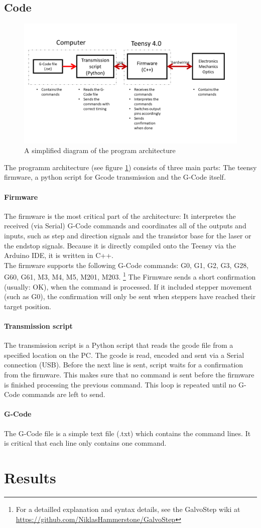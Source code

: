 \documentclass[a4paper, 11pt]{scrartcl}
\begin{document}
\subsection{Code}
\begin{figure}[H]
\begin{center}
\includegraphics[width=15cm]{img/programArchitecture.png}
\caption{A simplified diagram of the program architecture}
\label{code}
\end{center}
\end{figure}
The programm architecture (see figure \ref{code}) consists of three main parts: The teensy firmware, a python script for Gcode transmission and the G-Code itself. 
\paragraph{Firmware}
The firmware is the most critical part of the architecture: It interpretes the received (via Serial) G-Code commands and coordinates all of the outputs and inputs, such as step and direction signals and the transistor base for the laser or the endstop signals. Because it is directly compiled onto the Teensy via the Arduino IDE, it is written in C++.\\
The firmware supports the following G-Code commands: G0, G1, G2, G3, G28, G60, G61, M3, M4, M5, M201, M203. \footnote{For a detailled explanation and syntax details, see the GalvoStep wiki at \url{https://github.com/NiklasHammerstone/GalvoStep}} The Firmware sends a short confirmation (usually: OK), when the command is processed. If it included stepper movement (such as G0), the confirmation will only be sent when steppers have reached their target position.
\paragraph{Transmission script}
The transmission script is a Python script that reads the gcode file from a specified location on the PC. The gcode is read, encoded and sent via a Serial connection (USB). Before the next line is sent, script waits for a confirmation from the firmware. This makes sure that no command is sent before the firmware is finished processing the previous command. This loop is repeated until no G-Code commands are left to send.
\paragraph{G-Code}
The G-Code file is a simple text file (.txt) which contains the command lines. It is critical that each line only contains one command.
\section{Results}


\end{document}
